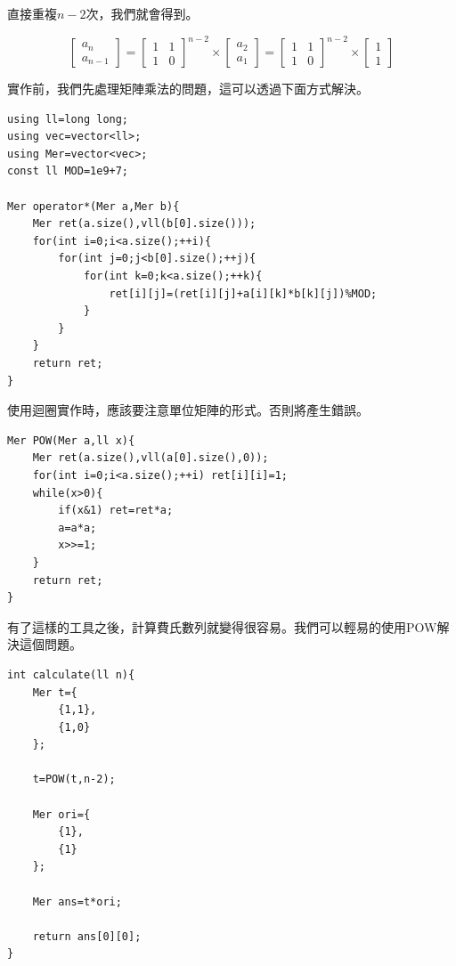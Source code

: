     直接重複$n-2$次，我們就會得到。

    $$\begin{bmatrix}
        a_n \\
        a_{n-1}
    \end{bmatrix}
    =
    \begin{bmatrix}
        1 & 1 \\
        1 & 0
    \end{bmatrix}^{n-2}
    \times 
    \begin{bmatrix}
        a_2 \\
        a_1
    \end{bmatrix}
    =
    \begin{bmatrix}
        1 & 1 \\
        1 & 0
    \end{bmatrix}^{n-2}
    \times 
    \begin{bmatrix}
        1 \\
        1
    \end{bmatrix}
    $$

    實作前，我們先處理矩陣乘法的問題，這可以透過下面方式解決。

\begin{lstlisting}[caption=矩陣乘法$O(n^3)$]
using ll=long long;
using vec=vector<ll>;
using Mer=vector<vec>;
const ll MOD=1e9+7;

Mer operator*(Mer a,Mer b){
    Mer ret(a.size(),vll(b[0].size()));
    for(int i=0;i<a.size();++i){
        for(int j=0;j<b[0].size();++j){
            for(int k=0;k<a.size();++k){
                ret[i][j]=(ret[i][j]+a[i][k]*b[k][j])%MOD;
            }
        }
    }
    return ret;
}
\end{lstlisting}

    使用迴圈實作時，應該要注意單位矩陣的形式。否則將產生錯誤。

\begin{lstlisting}[caption=矩陣快速冪]
Mer POW(Mer a,ll x){
    Mer ret(a.size(),vll(a[0].size(),0));
    for(int i=0;i<a.size();++i) ret[i][i]=1;
    while(x>0){
        if(x&1) ret=ret*a;
        a=a*a;
        x>>=1;
    }
    return ret;
}
\end{lstlisting}

    有了這樣的工具之後，計算費氏數列就變得很容易。我們可以輕易的使用POW解決這個問題。

\begin{lstlisting}[caption=費氏數列$O(\log{(n)})$算法]
int calculate(ll n){
    Mer t={
        {1,1},
        {1,0}
    };

    t=POW(t,n-2);

    Mer ori={
        {1},
        {1}
    };

    Mer ans=t*ori;

    return ans[0][0];
}    
\end{lstlisting}

